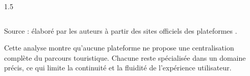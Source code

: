 \documentclass[a4paper,12pt]{report}
\begin{document}
\begin{spacing}{1.5}
\begin{table}[H]
{\begin{tabular}{|c|c|c|c|c|c|c|c|}
\end{tabular}
}
\end{table}
\vspace{0.3em}
{\footnotesize Source : élaboré par les auteurs à partir des sites officiels
des plateformes \cite{googletravel, booking, airbnb, tripadvisor2024, expedia2024, getyourguide2024, uber2024}.}



Cette analyse montre qu'aucune plateforme ne propose une centralisation complète du parcours touristique. Chacune reste spécialisée dans un domaine précis, ce qui limite la continuité et la fluidité de l'expérience utilisateur.




 \end{spacing}
\end{document}
